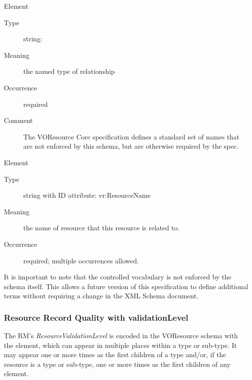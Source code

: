 \documentclass[11pt,a4paper]{ivoa}
\begin{document}
\begingroup\small\begin{bigdescription}\item[Element \xmlel{relationshipType}]
\begin{description}
\item[Type] string: 
\item[Meaning] 
                  the named type of relationship
               
\item[Occurrence] required
\item[Comment] 
                  The VOResource Core specification defines a standard
                  set of names that are not enforced by this schema,
                  but are otherwise required by the spec.
               

\end{description}
\item[Element \xmlel{relatedResource}]
\begin{description}
\item[Type] string with ID attribute: vr:ResourceName
\item[Meaning] 
                  the name of resource that this resource is related to.
               
\item[Occurrence] required; multiple occurrences allowed.

\end{description}


\end{bigdescription}\endgroup

\endgroup


It is important to note that the 
controlled vocabulary is not enforced by the schema itself.  This
allows a future version of this specification to define additional
terms without requiring a change in the XML Schema document.


\subsubsection{Resource Record Quality with validationLevel}



The RM's \emph{ResourceValidationLevel} is encoded in the VOResource
schema with the  element, which can appear in
multiple places within a  type or sub-type.  It may
appear one or more times as the first children of a 
type and/or, if the resource is a  type or sub-type,
one or more times as the first children of any 
element.  
\end{document}
